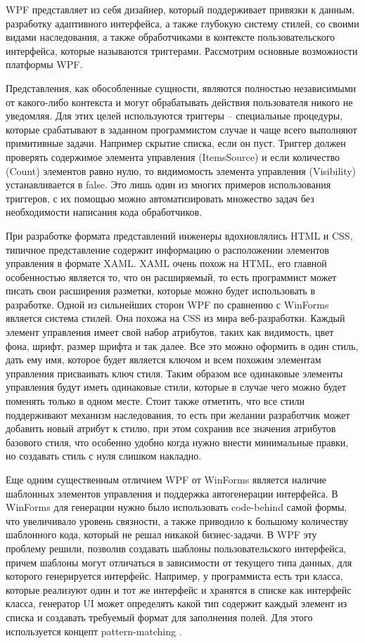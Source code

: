WPF представляет из себя дизайнер, который поддерживает привязки к данным, разработку адаптивного интерфейса, а также глубокую систему стилей, со своими видами наследования, а также обработчиками
в контексте пользовательского интерфейса, которые называются триггерами. Рассмотрим основные возможности платформы WPF.

Представления, как обособленные сущности, являются полностью независимыми от какого-либо контекста и могут обрабатывать действия пользователя никого не уведомляя. Для этих целей 
используются триггеры -- специальные процедуры, которые срабатывают в заданном программистом случае и чаще всего выполняют примитивные задачи. Например скрытие списка, если он пуст. 
Триггер должен проверять содержимое элемента управления (ItemsSource) и если количество (Count) элементов равно нулю, то видимомость элемента управления (Visibility) устанавливается в false.
Это лишь один из многих примеров использования триггеров, с их помощью можно автоматизировать множество задач без необходимости написания кода обработчиков.

При разработке формата представлений инженеры вдохновлялись \linebreak HTML и CSS, типичное представление содержит информацию о расположении элементов управления в формате XAML.
XAML очень похож на HTML, его главной особенностью является то, что он расширяемый, то есть программист может писать свои расширения разметки, которые можно будет использовать в разработке.
Одной из сильнейших сторон WPF по сравнению с WinForms является система стилей. Она похожа на CSS из мира веб-разработки. Каждый элемент управления имеет свой набор атрибутов, таких как
видимость, цвет фона, шрифт, размер шрифта и так далее. Все это можно оформить в один стиль, дать ему имя, которое будет является ключом и всем похожим элементам управления присваивать ключ стиля. 
Таким образом все одинаковые элементы управления будут иметь одинаковые стили, которые в случае чего можно будет поменять только в одном месте. Стоит также отметить, что
все стили поддерживают механизм наследования, то есть при желании разработчик может добавить новый атрибут к стилю, при этом сохранив все значения атрибутов базового стиля, 
что особенно удобно когда нужно внести минимальные правки, но создавать стиль с нуля слишком накладно.

Еще одним существенным отличием WPF от WinForms является наличие шаблонных элементов управления и поддержка автогенерации интерфейса. В WinForms для генерации нужно было использовать
code-behind самой формы, что увеличивало уровень связности, а также приводило к большому количеству шаблонного кода, который не решал никакой бизнес-задачи. В WPF эту проблему решили,
позволив создавать шаблоны пользовательского интерфейса, причем шаблоны могут отличаться в зависимости от текущего типа данных, для которого генерируется интерфейс. Например, у программиста
есть три класса, которые реализуют один и тот же интерфейс и хранятся в списке как интерфейс класса, генератор UI может определять какой тип содержит каждый элемент из списка и
создавать требуемый формат для заполнения полей. Для этого используется концепт pattern-matching \cite{msdn_pattern_matching}.

